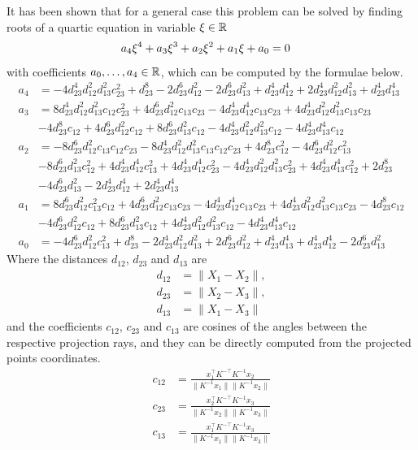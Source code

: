 It has been shown that for a general case this problem can be solved by finding roots of a quartic equation in variable $\xi\in\mathbb{R}$
\begin{align}
  a_4\xi^4 + a_3\xi^3 + a_2\xi^2 + a_1\xi + a_0 &= 0\labeleq{app:P3P:4}
\end{align}
with coefficients $a_0, \ldots, a_4\in\mathbb{R}$, which can be computed by the formulae below.
\begin{align}
  a_4 &= -4d_{23}^4d_{12}^2d_{13}^2c_{23}^2+d_{23}^8-2d_{23}^6d_{12}^2-2d_{23}^6d_{13}^2+d_{23}^4d_{12}^4+2d_{23}^4d_{12}^2d_{13}^2+d_{23}^4d_{13}^4\\
  a_3 &= 8d_{23}^4d_{12}^2d_{13}^2c_{12}c_{23}^2+4d_{23}^6d_{12}^2c_{13}c_{23}-4d_{23}^4d_{12}^4c_{13}c_{23}+4d_{23}^4d_{12}^2d_{13}^2c_{13}c_{23}\\
      &-4d_{23}^8c_{12}+4d_{23}^6d_{12}^2c_{12}+8d_{23}^6d_{13}^2c_{12}-4d_{23}^4d_{12}^2d_{13}^2c_{12}-4d_{23}^4d_{13}^4c_{12}\nonumber\\
  a_2 &= -8d_{23}^6d_{12}^2c_{13}c_{12}c_{23}-8d_{23}^4d_{12}^2d_{13}^2c_{13}c_{12}c_{23}+4d_{23}^8c_{12}^2-4d_{23}^6d_{12}^2c_{13}^2\\
      &-8d_{23}^6d_{13}^2c_{12}^2+4d_{23}^4d_{12}^4c_{13}^2+4d_{23}^4d_{12}^4c_{23}^2-4d_{23}^4d_{12}^2d_{13}^2c_{23}^2+4d_{23}^4d_{13}^4c_{12}^2+2d_{23}^8\nonumber\\
      &-4d_{23}^6d_{13}^2-2d_{23}^4d_{12}^4+2d_{23}^4d_{13}^4\nonumber\\
  a_1 &= 8d_{23}^6d_{12}^2c_{13}^2c_{12}+4d_{23}^6d_{12}^2c_{13}c_{23}-4d_{23}^4d_{12}^4c_{13}c_{23}+4d_{23}^4d_{12}^2d_{13}^2c_{13}c_{23}-4d_{23}^8c_{12}\\
      &-4d_{23}^6d_{12}^2c_{12}+8d_{23}^6d_{13}^2c_{12}+4d_{23}^4d_{12}^2d_{13}^2c_{12}-4d_{23}^4d_{13}^4c_{12}\nonumber\\
  a_0 &= -4d_{23}^6d_{12}^2c_{13}^2+d_{23}^8-2d_{23}^4d_{12}^2d_{13}^2+2d_{23}^6d_{12}^2+d_{23}^4d_{13}^4+d_{23}^4d_{12}^4-2d_{23}^6d_{13}^2
\end{align}
Where the distances $d_{12}$, $d_{23}$ and $d_{13}$ are
\begin{align}
  d_{12} &= \|X_1 - X_2\|,\\
  d_{23} &= \|X_2 - X_3\|,\\
  d_{13} &= \|X_1 - X_3\|
\end{align}
and the coefficients $c_{12}$, $c_{23}$ and $c_{13}$ are cosines of the angles between the respective projection rays, and they can be directly computed from the projected points coordinates.
\begin{align}
  c_{12} &= \frac{x_1^\top K^{-\top} K^{-1}x_2}{\|K^{-1}x_1\|\|K^{-1}x_2\|}\\
  c_{23} &= \frac{x_2^\top K^{-\top} K^{-1}x_3}{\|K^{-1}x_2\|\|K^{-1}x_3\|}\\
  c_{13} &= \frac{x_1^\top K^{-\top} K^{-1}x_3}{\|K^{-1}x_1\|\|K^{-1}x_3\|}
\end{align}


